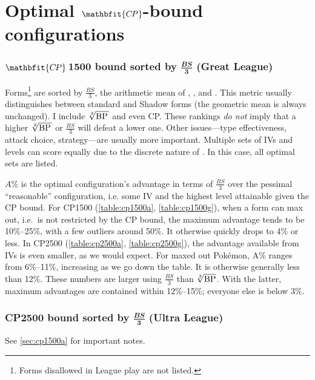 \chapter{Optimal $\mathbfit{C\kern -1pt P}$-bound configurations\label{chap:optimal}}
\subsection[\CP1500 bound sorted by $\frac{\mathit{BS}}{3}$ (Great League)]%
{$\mathbfit{C\kern -1ptP}$\,1500 bound sorted by $\frac{\mathbfit{BS}}{\mathbf3}$ (Great League)\label{sec:cp1500a}}

Forms\footnote{Forms disallowed in League play are not listed.} are sorted by $\frac{\mathit{BS}}{3}$,
  the arithmetic mean of , , and \MHP\@.
This metric usually distinguishes between standard and Shadow forms (the geometric mean is always unchanged).
I include $\sqrt[3]{\mbox{$\mathrm{BP}$}\,}$ and even CP\@.
These rankings \textit{do not} imply that a higher $\sqrt[3]{\mbox{$\mathrm{BP}$}\,}$ or $\frac{\mathit{BS}}{3}$
  will defeat a lower one.
Other issues---type effectiveness, attack choice, strategy---are usually more important.
Multiple sets of IVs and levels can score equally due to the discrete nature of \MHP\@.
In this case, all optimal sets are listed.

$A\%$ is the optimal configuration's advantage in terms of $\frac{BS}{3}$
  over the pessimal ``reasonable'' configuration, i.e. some IV
  and the highest level attainable given the CP bound.
For CP1500 (\autoref{table:cp1500a}, \autoref{table:cp1500g}), when a form can max out, i.e.\ is not restricted by the CP bound,
  the maximum advantage tends to be 10\%--25\%, with a few outliers around 50\%.
It otherwise quickly drops to 4\% or less.
In CP2500 (\autoref{table:cp2500a}, \autoref{table:cp2500g}), the advantage available from IVs is even smaller, as we would expect.
For maxed out Pokémon, A\% ranges from 6\%--11\%, increasing as we go down the table.
It is otherwise generally less than 12\%.
These numbers are larger using $\frac{\mathit{BS}}{3}$ than $\sqrt[3]{\mbox{$\mathrm{BP}$}}$.
With the latter, maximum advantages are contained within 12\%--15\%; everyone else is below 3\%.

\subsection[CP2500 bound sorted by $\frac{\mathit{BS}}{3}$ (Ultra League)]%
{CP2500 bound sorted by $\frac{\mathbfit{BS}}{\mathbf3}$ (Ultra League)}
See \autoref{sec:cp1500a} for important notes.

